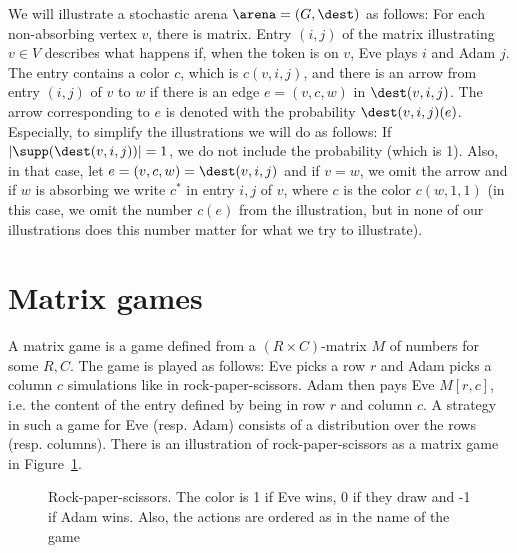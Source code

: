 We will illustrate a stochastic arena $\arena=(G,\dest)$ as follows:
For each non-absorbing vertex $v$, there is matrix.
 Entry $(i,j)$ of the matrix illustrating $v\in V$ describes what happens if, when the token is on $v$, Eve plays $i$ and Adam $j$. The entry contains a color $c$, which is $c(v,i,j)$, and 
there is an arrow from entry $(i,j)$ of $v$ to $w$ if there is an edge   
$e=(v,c,w)$ in $\dest(v,i,j)$. 
 The arrow corresponding to $e$ is denoted with the probability $\dest(v,i,j)(e)$. 
Especially, to simplify the illustrations we will do as follows: If $|\supp(\dest(v,i,j))|=1$, we do not include the probability (which is 1). Also, in that case, let $e=(v,c,w)=\dest(v,i,j)$ 
and 
if $v=w$, we omit the arrow and if $w$ is absorbing we write $c^*$ in entry $i,j$ of $v$, where $c$ is the color $c(w,1,1)$ (in this case, we omit the number $c(e)$ from the illustration, but in none of our illustrations does this number matter for what we try to illustrate). 




\section{Matrix games}
A matrix game is a game defined from a $(R\times C)$-matrix $M$  of numbers for some $R,C$.
The game is played as follows: Eve picks a row $r$ and Adam picks a column $c$ simulations like in rock-paper-scissors. Adam then pays Eve $M[r,c]$, i.e. the content of the entry defined by being in row $r$ and column $c$.
A strategy in such a game for Eve (resp. Adam) consists of a distribution over the rows (resp. columns). 
There is an illustration of rock-paper-scissors as a matrix game in Figure~\ref{fig:rps}.


\begin{figure}

\center
{}
\caption{Rock-paper-scissors. The color is 1 if Eve wins, 0 if they draw and -1 if Adam wins. Also, the actions are ordered as in the name of the game}\label{fig:rps}
\end{figure}

